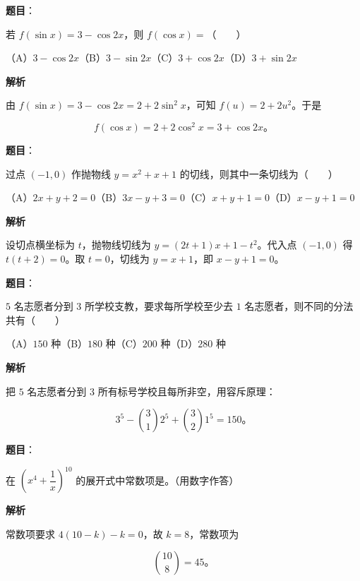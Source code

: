 \begin{answer}

\textbf{题目}：

若 $f(\sin x)=3-\cos2x$，则 $f(\cos x)=$\mbox{（　　）}

（A）$3-\cos2x$\quad（B）$3-\sin2x$\quad（C）$3+\cos2x$\quad（D）$3+\sin2x$

\textbf{解析}

由 $f(\sin x)=3-\cos2x=2+2\sin^2x$，可知 $f(u)=2+2u^2$。于是

\nopagebreak[4]
\[
f(\cos x)=2+2\cos^2x=3+\cos2x\text{。}
\]


\end{answer}
\begin{answer}

\textbf{题目}：

过点 $(-1,0)$ 作抛物线 $y=x^2+x+1$ 的切线，则其中一条切线为\mbox{（　　）}

（A）$2x+y+2=0$\quad（B）$3x-y+3=0$\quad（C）$x+y+1=0$\quad（D）$x-y+1=0$

\textbf{解析}

设切点横坐标为 $t$，抛物线切线为 $y=(2t+1)x+1-t^2$。代入点 $(-1,0)$ 得 $t(t+2)=0$。取 $t=0$，切线为 $y=x+1$，即 $x-y+1=0$。


\end{answer}
\begin{answer}

\textbf{题目}：

$5$ 名志愿者分到 $3$ 所学校支教，要求每所学校至少去 $1$ 名志愿者，则不同的分法共有\mbox{（　　）}

（A）$150$ 种\quad（B）$180$ 种\quad（C）$200$ 种\quad（D）$280$ 种

\textbf{解析}

把 $5$ 名志愿者分到 $3$ 所有标号学校且每所非空，用容斥原理：

\nopagebreak[4]
\[
3^5-\binom31 2^5+\binom32 1^5=150\text{。}
\]


\end{answer}
\begin{answer}

\textbf{题目}：

在 $\left(x^4+\dfrac1x\right)^{10}$ 的展开式中常数项是\gkblank{}。（用数字作答）

\textbf{解析}

常数项要求 $4(10-k)-k=0$，故 $k=8$，常数项为

\nopagebreak[4]
\[
\binom{10}{8}=45\text{。}
\]


\end{answer}
